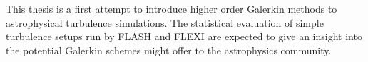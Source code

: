 This thesis is a first attempt to introduce higher order Galerkin methods to
astrophysical turbulence simulations. The statistical evaluation of simple
turbulence setups run by FLASH and FLEXI are expected to give an insight into
the potential Galerkin schemes might offer to the astrophysics community.
